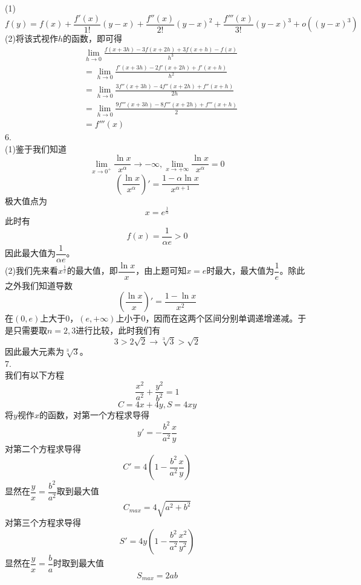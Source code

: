 \documentclass[utf8]{ctexart}
\begin{document}
(1)
\[f(y)=f(x)+\frac{f'(x)}{1!}(y-x)+\frac{f''(x)}{2!}(y-x)^2+\frac{f'''(x)}{3!}(y-x)^3+o((y-x)^3)\]
(2)将该式视作$h$的函数，即可得
\begin{align*}
	&\lim_{h\rightarrow0}\frac{f(x+3h)-3f(x+2h)+3f(x+h)-f(x)}{h^3}\\
	&=\lim_{h\rightarrow0}\frac{f'(x+3h)-2f'(x+2h)+f'(x+h)}{h^2}\\
	&=\lim_{h\rightarrow0}\frac{3f''(x+3h)-4f''(x+2h)+f''(x+h)}{2h}\\
	&=\lim_{h\rightarrow0}\frac{9f'''(x+3h)-8f'''(x+2h)+f'''(x+h)}{2}\\
	&=f'''(x)
\end{align*}
6.\\
(1)鉴于我们知道
\[\lim_{x\rightarrow0^+}\frac{\ln x}{x^\alpha}\rightarrow-\infty,\lim_{x\rightarrow+\infty}\frac{\ln x}{x^\alpha}=0\]
\[(\frac{\ln x}{x^\alpha})'=\frac{1-\alpha\ln x}{x^{\alpha+1}}\]
极大值点为
\[x=e^\frac{1}{\alpha}\]
此时有
\[f(x)=\frac{1}{\alpha e}>0\]
因此最大值为$\dfrac{1}{\alpha e}$。\\
(2)我们先来看$x^\frac{1}{x}$的最大值，即$\dfrac{\ln x}{x}$，由上题可知$x=e$时最大，最大值为$\dfrac{1}{e}$。除此之外我们知道导数
\[(\frac{\ln x}{x})'=\frac{1-\ln x}{x^2}\]
在$(0,e)$上大于$0$，$(e,+\infty)$上小于$0$，因而在这两个区间分别单调递增递减。于是只需要取$n=2,3$进行比较，此时我们有
\[3>2\sqrt{2}\rightarrow\sqrt[3]{3}>\sqrt{2}\]
因此最大元素为$\sqrt[3]{3}$。\\
7.\\
我们有以下方程
\[\frac{x^2}{a^2}+\frac{y^2}{b^2}=1\]
\[C=4x+4y,S=4xy\]
将$y$视作$x$的函数，对第一个方程求导得
\[y'=-\frac{b^2}{a^2}\frac{x}{y}\]
对第二个方程求导得
\[C'=4(1-\frac{b^2}{a^2}\frac{x}{y})\]
显然在$\dfrac{y}{x}=\dfrac{b^2}{a^2}$取到最大值
\[C_{max}=4\sqrt{a^2+b^2}\]
对第三个方程求导得
\[S'=4y(1-\frac{b^2}{a^2}\frac{x^2}{y^2})\]
显然在$\dfrac{y}{x}=\dfrac{b}{a}$时取到最大值
\[S_{max}=2ab\]
\end{document}
